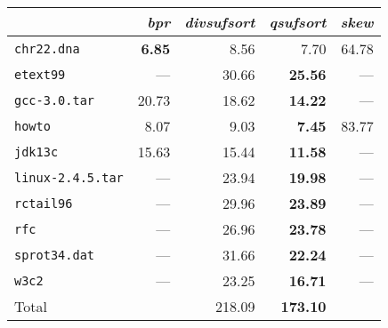 \begin{tabular}{l r r r r } \toprule
 & \emph{bpr} & \emph{divsufsort} & \emph{qsufsort} & \emph{skew}\\ \midrule
\texttt{chr22.dna} & \textbf{6.85} & 8.56 & 7.70 & 64.78\\
\texttt{etext99} & --- & 30.66 & \textbf{25.56} & ---\\
\texttt{gcc-3.0.tar} & 20.73 & 18.62 & \textbf{14.22} & ---\\
\texttt{howto} & 8.07 & 9.03 & \textbf{7.45} & 83.77\\
\texttt{jdk13c} & 15.63 & 15.44 & \textbf{11.58} & ---\\
\texttt{linux-2.4.5.tar} & --- & 23.94 & \textbf{19.98} & ---\\
\texttt{rctail96} & --- & 29.96 & \textbf{23.89} & ---\\
\texttt{rfc} & --- & 26.96 & \textbf{23.78} & ---\\
\texttt{sprot34.dat} & --- & 31.66 & \textbf{22.24} & ---\\
\texttt{w3c2} & --- & 23.25 & \textbf{16.71} & ---\\
 \midrule
Total &  & 218.09 & \textbf{173.10} & \\
 \bottomrule
\end{tabular}
